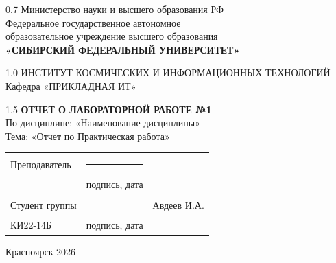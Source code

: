 \begin{titlepage}
	\begin{center}
		\begin{spacing}{0.7}
		Министерство науки и высшего образования РФ\\
		{\small Федеральное государственное автономное}\\
		{\small образовательное учреждение высшего образования}\\
		\textbf{\small«СИБИРСКИЙ ФЕДЕРАЛЬНЫЙ УНИВЕРСИТЕТ»}\\
		\end{spacing}
		
		\vfill
		
		\begin{spacing}{1.0}
		ИНСТИТУТ КОСМИЧЕСКИХ И ИНФОРМАЦИОННЫХ ТЕХНОЛОГИЙ\\
		Кафедра «ПРИКЛАДНАЯ ИТ»\\
		\end{spacing}
		
		\vfill
		\vfill
		
		\begin{spacing}{1.5}
			\textbf{\large ОТЧЕТ О ЛАБОРАТОРНОЙ РАБОТЕ №1}\\[5mm]
			По дисциплине: «Наименование дисциплины»\\[3mm]
			Тема: «Отчет по Практическая работа»
		\end{spacing}
    \end{center}		

	\vfill
	\vfill
	
\noindent
\begin{tabular}{@{} p{} p{} p{} @{}}
	Преподаватель    & \rule{3.5cm}{.1pt} &   \\
	                 & {\scriptsize подпись, дата} & \\ [4ex]
	Студент группы   & \rule{3.5cm}{.1pt} & Авдеев И.А. \\
	КИ22-14Б & {\scriptsize подпись, дата} & \\
\end{tabular}

\vfill
\begin{center}Красноярск 2026\end{center}
\end{titlepage}
\restoregeometry